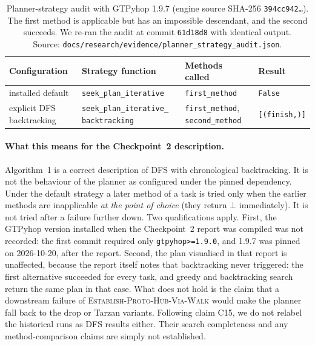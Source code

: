 \begin{table}[H]
\centering
\caption{Planner-strategy audit with GTPyhop 1.9.7 (engine source SHA-256 \texttt{394cc942\ldots}).
The first method is applicable but has an impossible descendant, and the second succeeds. We re-ran the
audit at commit \texttt{61d18d8} with identical output.\\ Source:
\texttt{docs/research/evidence/planner\_strategy\_audit.json}.}
\label{tab:recovery-audit}
\small
\begin{tabularx}{\linewidth}{@{}l>{\raggedright\arraybackslash}X>{\raggedright\arraybackslash}Xl@{}}
\toprule
Configuration & Strategy function & Methods called & Result \\
\midrule
installed default & \texttt{seek\_plan\_iterative} & \texttt{first\_method} & \texttt{False} \\
explicit DFS backtracking & \texttt{seek\_plan\_iterative\_} \texttt{backtracking} & \texttt{first\_method}, \texttt{second\_method} & \texttt{[(finish,)]} \\
\bottomrule
\end{tabularx}
\end{table}

\paragraph{What this means for the Checkpoint~2 description.} Algorithm~1 is a correct description of
DFS with chronological backtracking. It is not the behaviour of the planner as configured under the
pinned dependency. Under the default strategy a later method of a task is tried only when the earlier
methods are inapplicable \emph{at the point of choice} (they return $\bot$ immediately). It is not tried
after a failure further down. Two qualifications apply. First, the GTPyhop version installed when the
Checkpoint~2 report was compiled was not recorded: the first commit required only
\texttt{gtpyhop>=1.9.0}, and 1.9.7 was pinned on 2026-10-20, after the report. Second, the plan
visualised in that report is unaffected, because the report itself notes that backtracking never
triggered: the first alternative succeeded for every task, and greedy and backtracking search return the
same plan in that case. What does not hold is the claim that a downstream failure of
\textsc{Establish-Proto-Hub-Via-Walk} would make the planner fall back to the drop or Tarzan variants.
Following claim C15, we do not relabel the historical runs as DFS results either. Their search
completeness and any method-comparison claims are simply not established.


